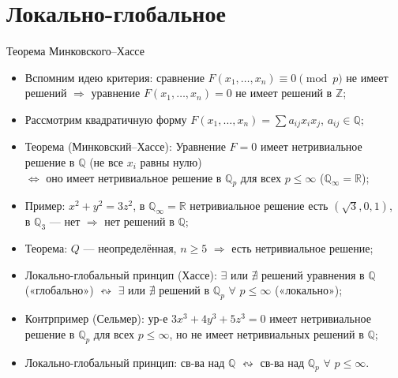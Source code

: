 \documentclass[serif, aspectratio=169]{beamer}
\newcommand{\sagemark}{%
  \textcolor{green!40!black}{\textbf{\texttt{sage:...}}}%
}
\begin{document}
\section{Локально-глобальное}

\begin{frame}{Теорема Минковского--Хассе}
    \begin{itemize}
        \item Вспомним идею критерия: сравнение $F(x_1,\dots,x_n)\equiv 0 \pmod{p}$ не имеет решений $\Rightarrow$ уравнение $F(x_1,\dots,x_n)= 0$ не имеет решений в $\mathbb{Z}$;
        \item Рассмотрим квадратичную форму $F(x_1,\dots,x_n)=\sum a_{ij}x_ix_j$, $a_{ij}\in\mathbb{Q}$;
        \item Теорема (Минковский--Хассе): Уравнение $F=0$
        имеет нетривиальное решение в $\mathbb{Q}$ (не все $x_i$ равны нулю) \\ 
        $\Leftrightarrow$ оно имеет нетривиальное решение в $\mathbb{Q}_p$ для всех $p\leqslant\infty$ ($\mathbb{Q}_\infty=\mathbb{R}$);
        \item Пример: $x^2+y^2=3z^2$, в $\mathbb{Q}_\infty=\mathbb{R}$ нетривиальное решение есть $(\sqrt3,0,1)$,\\ в $\mathbb{Q}_3$ --- нет $\Rightarrow$ нет решений в $\mathbb{Q}$;
        \item Теорема: $Q$ --- неопределённая, $n\geqslant5$ $\Rightarrow$ есть нетривиальное решение;
        \item Локально-глобальный принцип (Хассе): $\exists$ или $\nexists$ решений уравнения в $\mathbb{Q}$ («глобально») $\leftrightsquigarrow$ $\exists$ или $\nexists$ решений в $\mathbb{Q}_p$ $\forall$ $p\leqslant\infty$ («локально»);
        \item Контрпример (Сельмер): ур-е $3x^3+4y^3+5z^3=0$ имеет нетривиальное решение в $\mathbb{Q}_p$ для всех $p\leqslant\infty$, но не имеет нетривиальных решений в $\mathbb{Q}$;
        \item Локально-глобальный принцип: св-ва над $\mathbb{Q}$ $\leftrightsquigarrow$ св-ва над $\mathbb{Q}_p$ $\forall$ $p\leqslant\infty$.

    \end{itemize}


\end{frame}
\end{document}

